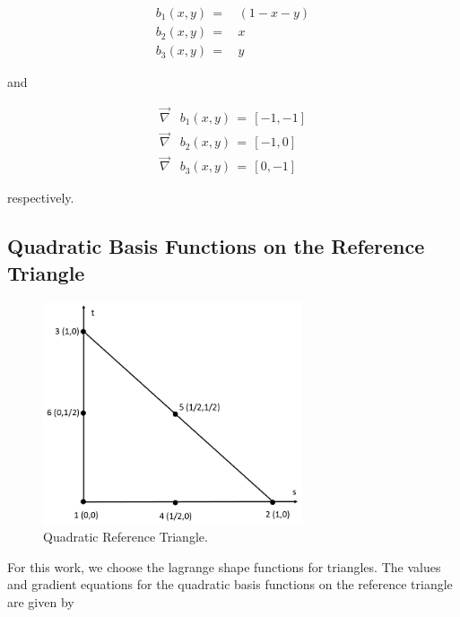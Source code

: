 \documentclass[11pt]{article}
\begin{document}
\begin{equation}
\label{eq::reftri_quad_basis_vals}
\begin{aligned}
b_1(x,y) \, =& \, (1-x-y) \\
b_2(x,y) \, =& \, x \\
b_3(x,y) \, =& \, y
\end{aligned}
\end{equation}

\noindent and

\begin{equation}
\label{eq::reftri_quad_basis_grads}
\begin{aligned}
\vec{\nabla}& b_1(x,y) \, = \, \left[ -1 , -1   \right] \\
\vec{\nabla}& b_2(x,y) \, = \, \left[ -1, 0   \right] \\
\vec{\nabla}& b_3(x,y) \, = \, \left[ 0, -1   \right] 
\end{aligned}
\end{equation}

\noindent respectively.

\subsection{Quadratic Basis Functions on the Reference Triangle}
\label{sec::triref_quadratic}


\begin{figure}[hbt]
\centering
\includegraphics[width=3.0in]{./Figures/ref_triangle_quadratic.jpg}
\caption{Quadratic Reference Triangle.}
\hspace{0.5cm}
\label{fig::ref_triangle_quad}
\end{figure}

For this work, we choose the lagrange shape functions for triangles. The values and gradient equations for the quadratic basis functions on the reference triangle are given by
\end{document}
